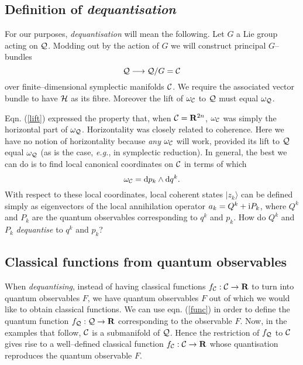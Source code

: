 \documentclass[a4paper,a4paper]{article}
\begin{document}
\subsection{Definition of {\it dequantisation}}\label{foli}

For our purposes, {\it dequantisation} will mean the following.
Let $G$ a Lie group acting on ${\cal Q}$. Modding out by the action of $G$
we will construct principal $G$--bundles
\begin{equation}
{\cal Q}\longrightarrow {\cal Q}/G={\cal C}
\label{pri}
\end{equation}
over finite--dimensional symplectic manifolds ${\cal C}$.  We require 
the associated vector bundle to have ${\cal H}$ as its fibre. 
Moreover the lift of $\omega_{\cal C}$ to ${\cal Q}$ 
must equal $\omega_{\cal Q}$. 

Eqn. (\ref{lift}) expressed the property that, when ${\cal C}={\bf R}^{2n}$, 
$\omega_{\cal C}$ was simply the horizontal part of $\omega_{\cal Q}$.
Horizontality was closely related to coherence. 
Here we have no notion of horizontality because {\it any} 
$\omega_{\cal C}$ will work, provided its lift to ${\cal Q}$ 
equal $\omega_{\cal Q}$ (as is the case, {\it e.g.}, in symplectic reduction).
In general, the best we can do is to find local canonical coordinates on ${\cal C}$ 
in terms of which 
\begin{equation}
\omega_{\cal C}={\rm d} p_k \wedge {\rm d} q^k.
\label{cano}
\end{equation}
With respect to these local coordinates, local coherent states $|z_k\rangle$ 
can be defined simply as eigenvectors of the local annihilation operator 
$a_k=Q^k+{\rm i} 
P_k$, where $Q^k$ and $P_k$ are the quantum observables corresponding to 
$q^k$ and $p_k$. How do $Q^k$ and $P_k$ {\it dequantise} to $q^k$ and $p_k$?

\subsection{Classical functions from quantum observables}\label{clafunct}

When {\it dequantising}, instead of having classical functions 
$f_{\cal C}:{\cal C}\to{\bf R}$ 
to turn into quantum observables $F$, we have quantum observables $F$ out of which 
we would like to obtain classical functions. We can use eqn. (\ref{func}) in order to 
define the quantum function $f_{\cal Q}:{\cal Q}\to{\bf R}$ corresponding 
to the observable $F$. Now, in the examples that follow,
${\cal C}$ is a submanifold of ${\cal Q}$. 
Hence the restriction of $f_{\cal Q}$ to ${\cal C}$ gives rise to 
a well--defined classical function $f_{\cal C}:{\cal C}\to {\bf R}$ 
whose quantisation reproduces the quantum observable $F$.
\end{document}
